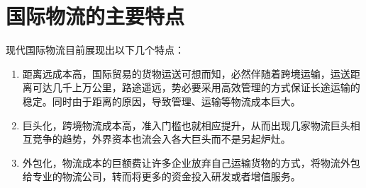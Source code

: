\section{国际物流的主要特点}
现代国际物流目前展现出以下几个特点：
\begin{enumerate}[(1)]
\setlength{\itemsep}{0ex}
\item 距离远成本高，国际贸易的货物运送可想而知，必然伴随着跨境运输，运送距离可达几千上万公里，路途遥远，势必要采用高效管理的方式保证长途运输的稳定。同时由于距离的原因，导致管理、运输等物流成本巨大。
\item 巨头化，跨境物流成本高，准入门槛也就相应提升，从而出现几家物流巨头相互竞争的趋势，外界资本也流会入各大巨头而不是另起炉灶。
\item 外包化，物流成本的巨额费让许多企业放弃自己运输货物的方式，将物流外包给专业的物流公司，转而将更多的资金投入研发或者增值服务。
\end{enumerate}

